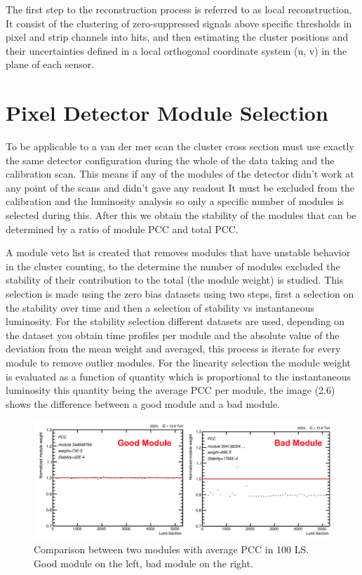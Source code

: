 The first step to the reconstruction process is referred to as local reconstruction. It consist of the clustering of zero-suppressed signals above specific thresholds in pixel and strip channels into hits, and then estimating the cluster positions and their uncertainties defined in a local orthogonal coordinate system (u, v) in the plane of each sensor.  \cite{cluster2}

\section{Pixel Detector Module Selection}

To be applicable to a van der mer scan the cluster cross section must use exactly the same detector configuration during the whole of the data taking and the calibration scan. This means if any of the modules of the detector didn't work at any point of the scans and didn't gave any readout It must be excluded from the calibration and the luminosity analysis so only a specific number of modules is selected during this. After this we obtain the stability of the modules that can be determined by a ratio of module PCC and total PCC. \cite{PCC3}

A module veto list is created that removes modules that have unstable behavior in the cluster counting, to the determine the number of modules excluded the stability of their contribution to the total (the module weight) is studied. This selection is made using the zero bias datasets using two steps, first a selection on the stability over time and then a selection of stability vs instantaneous luminosity. For the stability selection different datasets are used, depending on the dataset you obtain time profiles per module and the absolute value of the deviation from the mean weight and averaged, this process is iterate for every module to remove outlier modules. For the linearity selection the module weight is evaluated as a function of quantity which is proportional to the instantaneous luminosity this quantity being the average PCC per module, the image (2.6) shows the difference between a good module and a bad module. 

\begin{figure}[H]
    \centering
    \includegraphics[height=0.35\textwidth ,width=1\textwidth]{module.png}
    \caption{Comparison between two modules with average PCC in 100 LS. Good module on the left, bad module on the right.}
    \label{fig:modules}
\end{figure}


